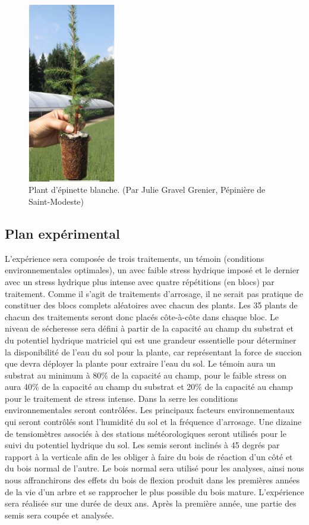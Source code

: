 \documentclass[a4paper,12pt]{report}
\begin{document}
\begin{figure}
	
	\centering
	\includegraphics[width=0.35\textwidth]{plant_epinette.png}
	\caption{Plant d'épinette blanche. (Par Julie Gravel Grenier, Pépinière de Saint-Modeste)}
	\label{plant}	
	
\end{figure}

\subsection*{Plan expérimental}

L'expérience sera composée de trois traitements, un témoin (conditions environnementales optimales), un avec faible stress hydrique imposé et le dernier avec un stress hydrique plus intense avec quatre répétitions (en blocs) par traitement. Comme il s'agit de traitements d'arrosage, il ne serait pas pratique de constituer des blocs complets aléatoires avec chacun des plants. Les 35 plants de chacun des traitements seront donc placés côte-à-côte dans chaque bloc. Le niveau de sécheresse sera défini à partir de la capacité au champ du substrat et du potentiel hydrique matriciel qui est une grandeur essentielle pour déterminer la disponibilité de l’eau du sol pour la plante, car représentant la force de succion que devra déployer la plante pour extraire l’eau du sol. Le témoin aura un substrat au minimum à 80\% de la capacité au champ, pour le faible stress on aura 40\% de la capacité au champ du substrat et 20\% de la capacité au champ pour le traitement de stress intense. Dans la serre les conditions environnementales seront contrôlées. Les principaux facteurs environnementaux qui seront contrôlés sont l'humidité du sol et la fréquence d'arrosage. Une dizaine de tensiomètres associés à des stations météorologiques seront utilisés pour le suivi du potentiel hydrique du sol. Les semis seront inclinés à 45 degrés par rapport à la verticale afin de les obliger à faire du bois de réaction d'un côté et du bois normal de l'autre. Le bois normal sera utilisé pour les analyses, ainsi nous nous affranchirons des effets du bois de flexion produit dans les premières années de la vie d'un arbre \citep{Telewski1989} et se rapprocher le plus possible du bois mature. L'expérience sera réalisée sur une durée de deux ans. Après la première année, une partie des semis sera coupée et analysée.
\end{document}
